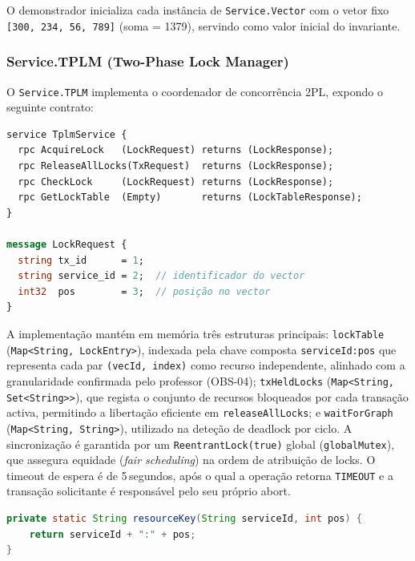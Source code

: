 O demonstrador inicializa cada instância de \texttt{Service.Vector} com o vetor fixo
\texttt{[300, 234, 56, 789]} (soma = 1379), servindo como valor inicial do invariante.

\subsubsection*{Service.TPLM (Two-Phase Lock Manager)}

O \texttt{Service.TPLM} implementa o coordenador de concorrência 2PL, expondo o
seguinte contrato:

\begin{lstlisting}[language=proto, caption={Contrato gRPC do \texttt{Service.TPLM} (tplm.proto).}]
service TplmService {
  rpc AcquireLock   (LockRequest) returns (LockResponse);
  rpc ReleaseAllLocks(TxRequest)  returns (LockResponse);
  rpc CheckLock     (LockRequest) returns (LockResponse);
  rpc GetLockTable  (Empty)       returns (LockTableResponse);
}

message LockRequest {
  string tx_id      = 1;
  string service_id = 2;  // identificador do vector
  int32  pos        = 3;  // posição no vector
}
\end{lstlisting}

A implementação mantém em memória três estruturas principais: \texttt{lockTable}
(\texttt{Map\textless String, LockEntry\textgreater}), indexada pela chave composta
\texttt{serviceId:pos} que representa cada par \texttt{(vecId,~index)} como recurso
independente, alinhado com a granularidade confirmada pelo professor (OBS-04);
\texttt{txHeldLocks} (\texttt{Map\textless String, Set\textless String\textgreater\textgreater}),
que regista o conjunto de recursos bloqueados por cada transação activa, permitindo a
libertação eficiente em \texttt{releaseAllLocks}; e \texttt{waitForGraph}
(\texttt{Map\textless String, String\textgreater}), utilizado na deteção de deadlock por
ciclo. A sincronização é garantida por um \texttt{ReentrantLock(true)} global
(\texttt{globalMutex}), que assegura equidade (\textit{fair scheduling}) na ordem de
atribuição de locks. O timeout de espera é de 5\,segundos, após o qual a operação retorna
\texttt{TIMEOUT} e a transação solicitante é responsável pelo seu próprio abort.

\begin{lstlisting}[language=Java, caption={Granularidade de lock por \texttt{(vecId,~index)} no \texttt{TwoPhaseLockManagerImpl}.}]
private static String resourceKey(String serviceId, int pos) {
    return serviceId + ":" + pos;
}
\end{lstlisting}

